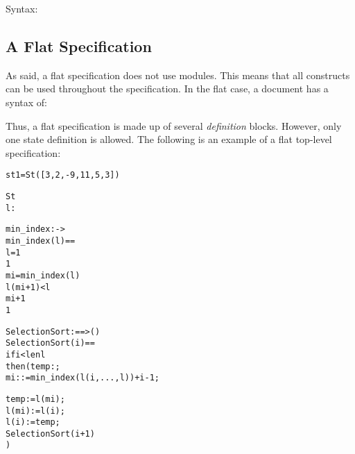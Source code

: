 \documentclass[\pformat,12pt]{article}
\begin{document}
\begin{description}
\item[Syntax:]

\end{description}

\subsection{A Flat Specification}\label{flat}

As said, a flat specification does not use modules. This means that all
constructs can be used throughout the specification. In the flat case, a
document has a syntax of:



Thus, a flat specification is made up of several {\it definition\/} blocks.
However, only one state definition is allowed. The following is an example
of a flat top-level specification:

\begin{alltt}

    st1 = St([3,2,-9,11,5,3])

   St 
    l:


  min_index :  -> 
  min_index(l) ==
      l = 1
     1
      mi = min_index( l)
          l(mi+1) <  l
           mi+1
           1


  SelectionSort :  ==> ()
  SelectionSort (i) ==
    if i < len l
    then ( temp: ;
           mi :  := min_index(l(i,..., l)) + i - 1;
         
          temp := l(mi);
          l(mi) := l(i);
          l(i) := temp;
          SelectionSort(i+1)
         )
\end{alltt}
\end{document}
